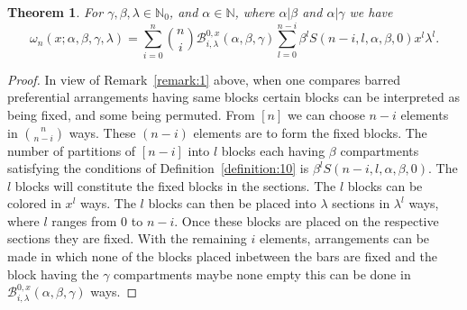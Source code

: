 \documentclass[12pt]{amsart}
\newtheorem{proof 1}{proof 1}
\newtheorem{theorem}{Theorem}[section]
\begin{document}
\begin{theorem}For $\gamma,\beta,\lambda\in\mathbb{N}_0$, and $\alpha\in \mathbb{N}$, where ${\alpha}|\beta$ and ${\alpha}|\gamma$ we have
	\begin{equation}
		\omega _{n}(x;{\alpha}, \beta, \gamma,\lambda)=\sum\limits_{i=0}^{n}\binom{n}{i}\mathcal{B}^{0,x}_{i,\lambda}(\alpha,\beta,\gamma)\sum\limits_{l=0}^{n-i}\beta^lS(n-i,l,\alpha,\beta,0)x^l\lambda^{l}.
	\end{equation}
\end{theorem}
\begin{proof}In view of Remark~\ref{remark:1} above, when one compares barred preferential arrangements having same blocks certain blocks can be interpreted as being fixed, and some being permuted. From $[n]$ we can choose $n-i$ elements in $\binom{n}{n-i}$ ways. These $(n-i)$ elements are to form the fixed blocks. The number of partitions of $[n-i]$ into $l$ blocks each having $\beta$ compartments satisfying the conditions of Definition~\ref{definition:10} is $\beta^lS(n-i,l,\alpha,\beta,0)$. The $l$ blocks will constitute the fixed blocks in the sections. The $l$ blocks can be colored in $x^l$ ways. The $l$ blocks can then be placed into $\lambda$ sections in $\lambda^l$ ways, where $l$ ranges from 0 to $n-i$. Once these blocks are placed on the respective sections they are fixed. With the remaining $i$ elements, arrangements can be made in which none of the blocks placed inbetween the bars are fixed and the block having the $\gamma$ compartments maybe none empty this can be done in  $\mathcal{B}^{0,x}_{i,\lambda}(\alpha,\beta,\gamma)$ ways.
	
\end{proof}
\end{document}
